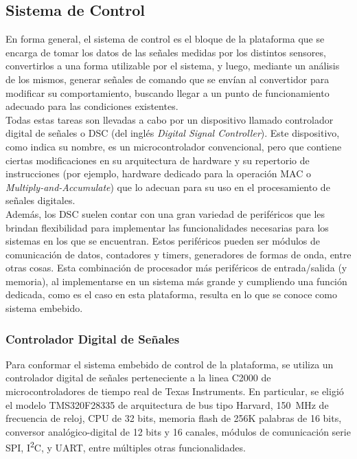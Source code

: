 \subsection{Sistema de Control}

En forma general, el sistema de control es el bloque de la plataforma que se encarga de tomar los datos de las señales medidas por los distintos sensores, convertirlos a una forma utilizable por el sistema, y luego, mediante un análisis de los mismos, generar señales de comando que se envían al convertidor para modificar su comportamiento, buscando llegar a un punto de funcionamiento adecuado para las condiciones existentes.\\

Todas estas tareas son llevadas a cabo por un dispositivo llamado {\Medium controlador digital de señales} o DSC (del inglés \textit{Digital Signal Controller}). Este dispositivo, como indica su nombre, es un microcontrolador convencional, pero que contiene ciertas modificaciones en su arquitectura de hardware y su repertorio de instrucciones (por ejemplo, hardware dedicado para la operación MAC o \textit{Multiply-and-Accumulate}) que lo adecuan para su uso en el procesamiento de señales digitales.\\

Además, los DSC suelen contar con una gran variedad de periféricos que les brindan flexibilidad para implementar las funcionalidades necesarias para los sistemas en los que se encuentran. Estos periféricos pueden ser módulos de comunicación de datos, contadores y timers, generadores de formas de onda, entre otras cosas. Esta combinación de procesador más periféricos de entrada/salida (y memoria), al implementarse en un sistema más grande y cumpliendo una función dedicada, como es el caso en esta plataforma, resulta en lo que se conoce como {\Medium sistema embebido}.\\

\subsubsection{Controlador Digital de Señales}

Para conformar el sistema embebido de control de la plataforma, se utiliza un controlador digital de señales perteneciente a la linea {\Medium C2000} de microcontroladores de tiempo real de Texas Instruments. En particular, se eligió el modelo {\Medium TMS320F28335} de arquitectura de bus tipo Harvard, \SI[]{150}{\mega\hertz} de frecuencia de reloj, CPU de 32 bits, memoria flash de 256K palabras de 16 bits, conversor analógico-digital de 12 bits y 16 canales, módulos de comunicación serie SPI, I\textsuperscript{2}C, y UART, entre múltiples otras funcionalidades.\textsuperscript{\cite{DSP-Datasheet}}


